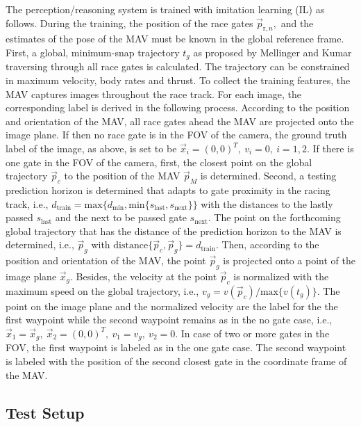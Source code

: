 The perception/reasoning system is trained with imitation learning (IL) as follows.
During the training, the position of the race gates $\vec p_{\text{r},n},$ and
the estimates of the pose of the MAV must be known in the global reference frame.
First, a global, minimum-snap trajectory $t_g$ as proposed by Mellinger and Kumar \cite{Mellinger2011}
traversing through all race gates is calculated.
The trajectory can be constrained in maximum velocity, body rates and thrust.
To collect the training features, the MAV captures images throughout the race track.
For each image, the corresponding label is derived in the following process.
According to the position and orientation of the MAV, 
all race gates ahead the MAV are projected onto the image plane.
If then no race gate is in the FOV of the camera,
the ground truth label of the image, as above, is set to be $\vec x_i = (0,0)^T,\ v_i =0,\ i=1,2 $.
If there is one gate in the FOV of the camera,
first, the closest point on the global trajectory $\vec p_c$ to the position of the MAV $\vec p_M$ is determined.
Second, a testing prediction horizon is determined that adapts to gate proximity in the racing track,
i.e., $d_\text{train} = \text{max} \{ d_\text{min}, \text{min} \{ s_\text{last} , s_\text{next} \}\} $
with the distances to the lastly passed $s_\text{last}$ and the next to be passed gate $s_\text{next}$.
The point on the forthcoming global trajectory that has the distance of the prediction horizon to the MAV is determined,
i.e., $\vec p_g$ with $\text{distance} \{ \vec p_c, \vec p_g \} = d_\text{train}$.
Then, according to the position and orientation of the MAV, the point $\vec p_g$ is projected onto a point of the image plane $\vec x_g$.
Besides, the velocity at the point $\vec p_c$ is normalized with the maximum speed on the global trajectory, 
i.e., $v_g = v(\vec p_c) / \text{max} \{v(t_g) \}$.
The point on the image plane and the normalized velocity are the label for the the first waypoint
while the second waypoint remains as in the no gate case, 
i.e., $\vec x_1 = \vec x_g,\ \vec x_2 = (0,0)^T,\ v_1 = v_g,\ v_2 = 0 $.
In case of two or more gates in the FOV,
the first waypoint is labeled as in the one gate case.
The second waypoint is labeled with the position of the second closest gate in the coordinate frame of the MAV.



\subsection{Test Setup} 


